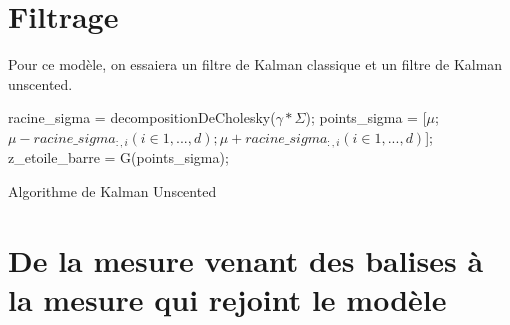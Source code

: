 \documentclass[a4paper, 8pt]{article}
\begin{document}
\section{Filtrage}

Pour ce modèle, on essaiera un filtre de Kalman classique et un filtre  de Kalman unscented.

%		
%	

\begin{algorithm}[H]
{
	racine\_sigma = decompositionDeCholesky($\gamma*\Sigma$);
	points\_sigma = [$\mu$; $\mu - racine\_sigma_{:,i}(i \in {1, ..., d}); \mu + racine\_sigma_{:,i} (i \in {1,..., d})$];
	z\_etoile\_barre = G(points\_sigma);
			
		
		
		
		
		
		
		
		}
		
	\caption{Algorithme de Kalman Unscented}
	\end{algorithm}

\section{De la mesure venant des balises à la mesure qui rejoint le modèle}
\end{document}
